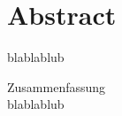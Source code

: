 %
\chapter*{Abstract}
\label{sec:abstract}
\vspace*{-10mm}

blablablub

\vspace*{20mm}

{ Zusammenfassung}\label{sec:abstract-diff} \\

blablablub
